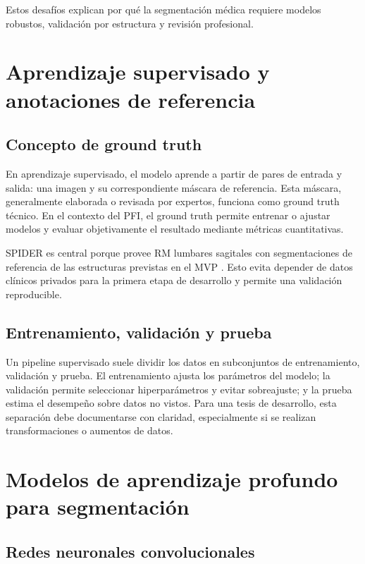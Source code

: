 Estos desafíos explican por qué la segmentación médica requiere modelos robustos, validación por estructura y revisión profesional.

\section{Aprendizaje supervisado y anotaciones de referencia}

\subsection{Concepto de ground truth}

En aprendizaje supervisado, el modelo aprende a partir de pares de entrada y salida: una imagen y su correspondiente máscara de referencia. Esta máscara, generalmente elaborada o revisada por expertos, funciona como ground truth técnico. En el contexto del PFI, el ground truth permite entrenar o ajustar modelos y evaluar objetivamente el resultado mediante métricas cuantitativas.

SPIDER es central porque provee RM lumbares sagitales con segmentaciones de referencia de las estructuras previstas en el MVP \parencite{vandergraaf_spider_2024}. Esto evita depender de datos clínicos privados para la primera etapa de desarrollo y permite una validación reproducible.

\subsection{Entrenamiento, validación y prueba}

Un pipeline supervisado suele dividir los datos en subconjuntos de entrenamiento, validación y prueba. El entrenamiento ajusta los parámetros del modelo; la validación permite seleccionar hiperparámetros y evitar sobreajuste; y la prueba estima el desempeño sobre datos no vistos. Para una tesis de desarrollo, esta separación debe documentarse con claridad, especialmente si se realizan transformaciones o aumentos de datos.

\section{Modelos de aprendizaje profundo para segmentación}

\subsection{Redes neuronales convolucionales}

